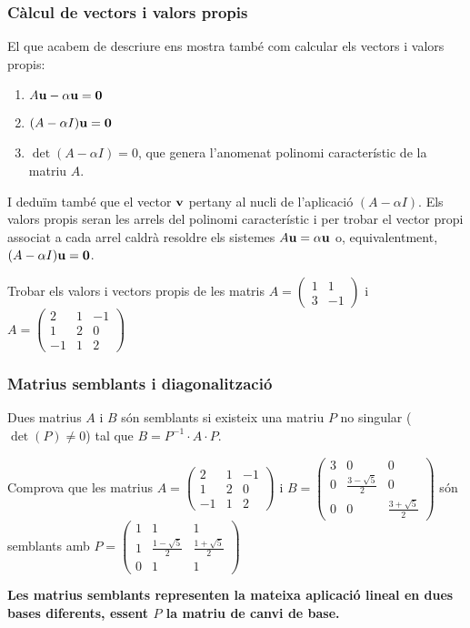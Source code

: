 \documentclass{beamer}
\begin{document}
\begin{frame}
  \frametitle{Càlcul de vectors i valors propis}
  El que acabem de descriure ens mostra també com calcular els vectors i valors propis:
  \begin{enumerate}
    \item $A\textbf{u}-\alpha \textbf{u}=\textbf{0}$
    \item $(A-\alpha I)\textbf{u}=\textbf{0}$
    \item $\det(A-\alpha I)=0$, que genera l'anomenat polinomi característic de la matriu $A$.
  \end{enumerate}
  I deduïm també que el vector $\textbf{v}$ pertany al nucli de l'aplicació $(A-\alpha I)$. Els valors propis seran les arrels del polinomi característic i per trobar el vector propi associat a cada arrel caldrà resoldre els sistemes $A\textbf{u}=\alpha \textbf{u}$ o, equivalentment, $(A-\alpha I)\textbf{u}=\textbf{0}$.

  \begin{exercici}{}
    Trobar els valors i vectors propis de les matris $A=\begin{pmatrix}1&1\\3&-1\end{pmatrix}$ i $A=\begin{pmatrix}2&1&-1\\1&2&0\\-1&1&2\end{pmatrix}$
  \end{exercici}
\end{frame}
\begin{frame}
  \frametitle{Matrius semblants i diagonalització}
  Dues matrius $A$ i $B$ són semblants si existeix una matriu $P$ no singular ($\det(P) \neq 0$) tal que $B=P^{-1}\cdot A \cdot P$.

  \begin{exercici}{}
    Comprova que les matrius
    $A=\begin{pmatrix}2&1&-1\\1&2&0\\-1&1&2\end{pmatrix}$ i
    $B=\begin{pmatrix}3&0&0\\0&\frac{3-\sqrt{5}}{2}&0\\0&0&\frac{3+\sqrt{5}}{2}\end{pmatrix}$
    són semblants amb
    $P=\begin{pmatrix}1&1&1\\1&\frac{1-\sqrt{5}}{2}&\frac{1+\sqrt{5}}{2}\\0&1&1\end{pmatrix}$
  \end{exercici}

  \vspace{\baselineskip}
  {\bf Les matrius semblants representen la mateixa aplicació lineal en dues bases diferents, essent $P$ la matriu de canvi de base.}

\end{frame}
\end{document}
